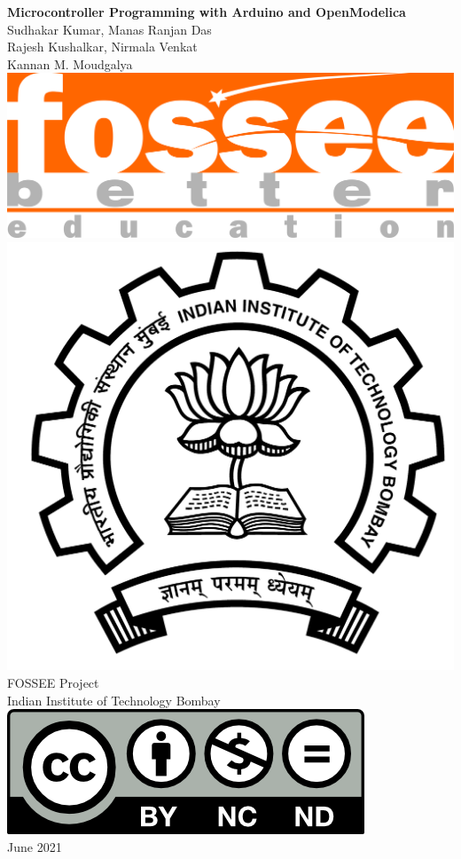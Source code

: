 \begin{center}
    {\bf {\Huge Microcontroller Programming with Arduino and OpenModelica}}
    \vfill
    Sudhakar Kumar, Manas Ranjan Das \\
    Rajesh Kushalkar, Nirmala Venkat \\
    Kannan M. Moudgalya \\
    \vfill
    \includegraphics[width=0.3\linewidth]{suppl/fossee_logo_hi.png} \quad
    \includegraphics[width=0.2\linewidth]{suppl/IITB-logo-HighRes.png} \\
    FOSSEE Project \\
    Indian Institute of Technology Bombay \\ [2mm]
    \includegraphics[width=0.15\linewidth]{suppl/by-nc-nd.png} \\ [1mm]
    June 2021
\end{center}

\clearpage
